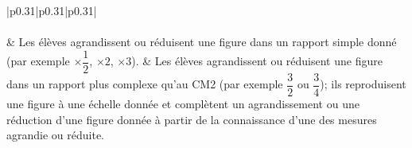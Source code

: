 {\tiny
\renewcommand{\arraystretch}{1.5}
\begin{tabular}{|p{0.31\linewidth}|p{0.31\linewidth}|p{0.31\linewidth}|}
\hline
{}\\\hline 
{}\\\hline 
&
Les élèves agrandissent ou réduisent une figure dans un rapport simple donné (par exemple $\times \dfrac{1}{2}$, $\times 2$, $\times 3$).
&
Les élèves agrandissent ou réduisent une figure dans un rapport plus complexe qu’au CM2 (par exemple $\dfrac{3}{2}$ ou $\dfrac{3}{4}$); ils reproduisent une figure à une échelle donnée et complètent un agrandissement ou une réduction d’une figure donnée à partir de la connaissance d’une des mesures agrandie ou réduite.
\\\hline
\end{tabular}
\renewcommand{\arraystretch}{1}
}